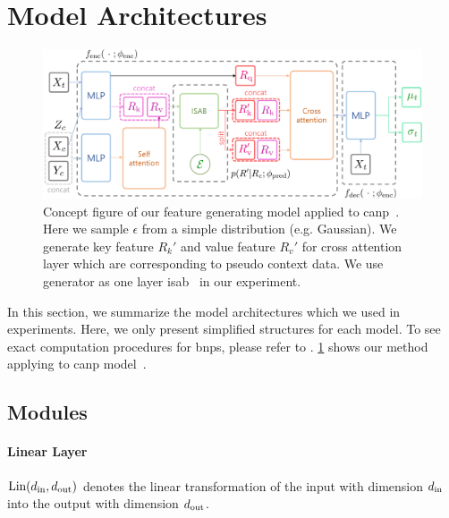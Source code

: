 \section{Model Architectures}
\label{app:sec:architectures}

\begin{figure}[t]
    \centering
    \includegraphics[width = \linewidth]{figure/main_concept_mpanp.pdf}
    \caption{Concept figure of our feature generating model applied to \gls{canp}~\citep{kim2018attentive}. Here we sample $\epsilon$ from a simple distribution (e.g. Gaussian). We generate key feature $R_k'$ and value feature $R_v'$ for cross attention layer which are corresponding to pseudo context data. We use generator as one layer \gls{isab}~\citep{lee2019set} in our experiment.
    }
    \label{figure/main_concept_mpanp}
\end{figure}

In this section, we summarize the model architectures which we used in experiments.
Here, we only present simplified structures for each model.
To see exact computation procedures for \glspl{bnp}, please refer to \citet{lee2020bootstrapping}. \cref{figure/main_concept_mpanp} shows our method applying to \gls{canp} model~\citep{kim2018attentive}.

\subsection{Modules}

\paragraph{Linear Layer} $\text{Lin}(d_{\text{in}},d_{\text{out}})$ denotes the linear transformation of the input with dimension $d_{\text{in}}$ into the output with dimension $d_{\text{out}}$.

